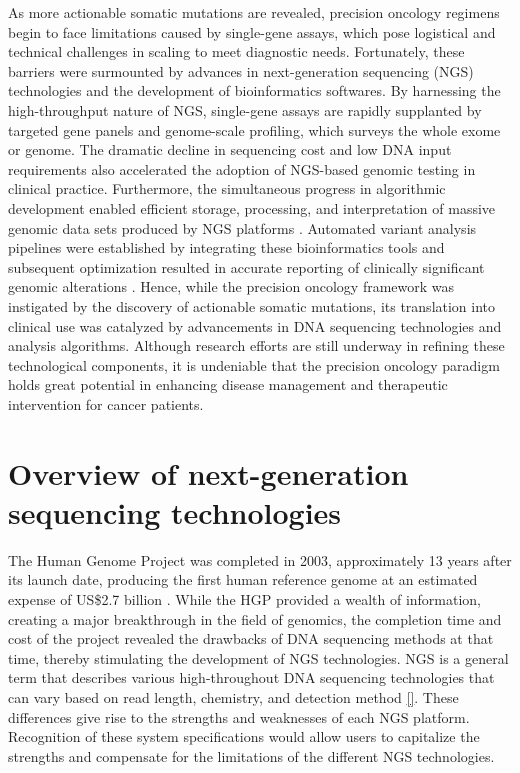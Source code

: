 As more actionable somatic mutations are revealed, precision oncology regimens begin to face limitations caused by single-gene assays, which pose logistical and technical challenges in scaling to meet diagnostic needs. Fortunately, these barriers were surmounted by advances in next-generation sequencing (NGS) technologies and the development of bioinformatics softwares. By harnessing the high-throughput nature of NGS, single-gene assays are rapidly supplanted by targeted gene panels and genome-scale profiling, which surveys the whole exome or genome. The dramatic decline in sequencing cost \cite{Wetterstrand2016} and low DNA input requirements \cite{Rykalina2014, Chung2016, So2017} also accelerated the adoption of NGS-based genomic testing in clinical practice. Furthermore, the simultaneous progress in algorithmic development enabled efficient storage, processing, and interpretation of massive genomic data sets produced by NGS platforms \cite{}. Automated variant analysis pipelines were established by integrating these bioinformatics tools and subsequent optimization resulted in accurate reporting of clinically significant genomic alterations \cite{}. Hence, while the precision oncology framework was instigated by the discovery of actionable somatic mutations, its translation into clinical use was catalyzed by advancements in DNA sequencing technologies and analysis algorithms. Although research efforts are still underway in refining these technological components, it is undeniable that the precision oncology paradigm holds great potential in enhancing disease management and therapeutic intervention for cancer patients.

\section{Overview of next-generation sequencing technologies}
\label{sec:Overviewofnext-generationsequencingtechnologies}

The Human Genome Project was completed in 2003, approximately 13 years after its launch date, producing the first human reference genome at an estimated expense of US\$2.7 billion \cite{NationalHumanGenomeResearchInstitute2010}. While the HGP provided a wealth of information, creating a major breakthrough in the field of genomics, the completion time and cost of the project revealed the drawbacks of DNA sequencing methods at that time, thereby stimulating the development of NGS technologies. NGS is a general term that describes various high-throughout DNA sequencing technologies that can vary based on read length, chemistry, and detection method \autoref{}. These differences give rise to the strengths and weaknesses of each NGS platform. Recognition of these system specifications would allow users to capitalize the strengths and compensate for the limitations of the different NGS technologies.

